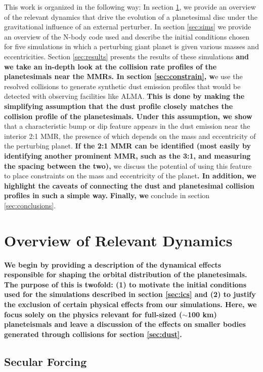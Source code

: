 \documentclass[fleqn,usenatbib]{mnras}
\begin{document}
This work is organized in the following way: In section \ref{sec:dynamics}, we provide an overview of the relevant dynamics that drive the evolution 
of a planetesimal disc under the gravitational influence of an external perturber. In section \ref{sec:sims} we provide an overview of the N-body code 
used and describe the initial conditions chosen for five simulations in which a perturbing giant planet is given various masses 
and eccentricities. Section \ref{sec:results} presents the results of these simulations \textbf{and we take an in-depth look at the collision rate profiles of the planetesimals near the MMRs. In section \ref{sec:constrain}, w}e use the resolved collisions to generate synthetic dust 
emission profiles that would be detected with observing facilities like ALMA. \textbf{This is done by making the simplifying assumption that the dust profile closely matches the collision profile of the planetesimals. Under this assumption, we show} that a characteristic bump 
or dip feature appears in the dust emission near the interior 2:1 MMR, the presence of which depends on the mass and eccentricity of the perturbing 
planet. \textbf{If the 2:1 MMR can be identified (most easily by identifying another prominent MMR, such as the 3:1, and measuring the spacing between the two),} we discuss the potential of using this feature to place constraints on the mass and eccentricity of the planet\textbf{. In addition, we highlight the caveats of connecting the dust and planetesimal collision profiles in such a simple way.} \textbf{Finally, we} conclude in section 
\ref{sec:conclusions}.

\section{Overview of Relevant Dynamics} \label{sec:dynamics}

\textbf{We begin by providing a description of the dynamical effects responsible for shaping the orbital distribution of the planetesimals. The purpose of this is twofold: (1) to motivate the initial conditions used for the simulations described in section \ref{sec:ics} and (2) to justify the exclusion of certain physical effects from our simulations. Here, we focus solely on the physics relevant for full-sized ($\sim$100 km) planeteismals and leave a discussion of the effects on smaller bodies generated through collisions for section \ref{sec:dust}.}

\subsection{Secular Forcing}\label{sec:sec_force}
\end{document}
